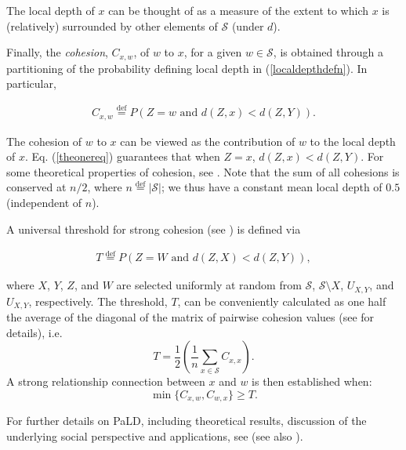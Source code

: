 \noindent The local depth of \(x\) can be thought of as a measure of the extent to which \(x\) is (relatively) surrounded by other elements of \(\mathcal{S}\) (under \(d\)).

Finally, the \emph{cohesion}, \(C_{x,w}\), of \(w\) to \(x\), for a given \(w\in \mathcal{S}\), is obtained through a partitioning of the probability defining local depth in (\ref{localdepthdefn}). In particular,

\begin{eqnarray}
C_{x,w} \stackrel{\mathrm{def}}{=}P(Z=w \mbox{ and } d(Z,x) < d(Z,Y))
\label{cohesdefn}.
\end{eqnarray}

\noindent The cohesion of \(w\) to \(x\) can be viewed as the contribution of \(w\) to the local depth of \(x\). Eq. (\ref{theonereq}) guarantees that when \(Z=x\), \(d(Z,x) < d(Z,Y)\). For some theoretical properties of cohesion, see \citet{berenhaut2022social}. Note that the sum of all cohesions is conserved at \(n/2\), where \(n\stackrel{\mathrm{def}}{=}|\mathcal{S}|\); we thus have a constant mean local depth of \(0.5\) (independent of \(n\)).

A universal threshold for strong cohesion (see \citet{berenhaut2022social}) is defined via

\begin{eqnarray}
T \stackrel{\mathrm{def}}{=}P(Z=W \text{ and } d(Z,X)<d(Z,Y)),
\label{Tsd0}
\end{eqnarray}

\noindent where \(X\), \(Y\), \(Z\), and \(W\) are selected uniformly at random from \(\mathcal{S}\), \(\mathcal{S}\setminus X\), \(U_{X,Y}\), and \(U_{X,Y}\), respectively. The threshold, \(T\), can be conveniently calculated as one half the average of the diagonal of the matrix of pairwise cohesion values (see \citet{berenhaut2022social} for details), i.e.
\begin{equation}
T = \frac{1}{2} \left( \frac{1}{n} \sum_{x\in \mathcal{S}} C_{x,x} \right).
\label{Tsd}
\end{equation}
A strong relationship connection between \(x\) and \(w\) is then established when:
\begin{equation}
\min \{ C_{x,w}, C_{w,x} \} \geq T.
\label{Tsd2}
\end{equation}

For further details on PaLD, including theoretical results, discussion of the underlying social perspective and applications, see \citet{berenhaut2022social} (see also \citet{berenhaut2022SIAM}).

